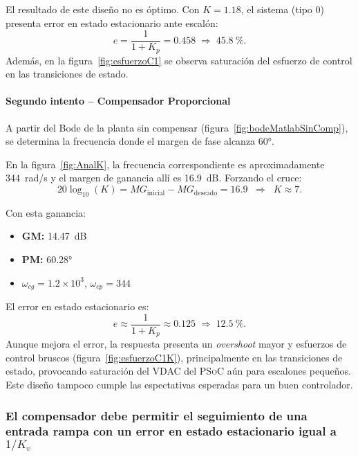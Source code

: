 El resultado de este diseño no es óptimo. Con $K = 1.18$, el sistema (tipo $0$) presenta error en estado estacionario ante escalón:
\[
e = \frac{1}{1+K_p} = 0.458 \;\Rightarrow\; \SI{45.8}{\percent}.
\]
Además, en la figura~\ref{fig:esfuerzoC1} se observa saturación del esfuerzo de control en las transiciones de estado.

\paragraph{Segundo intento – Compensador Proporcional}  

A partir del Bode de la planta sin compensar (figura~\ref{fig:bodeMatlabSinComp}), se determina la frecuencia donde el margen de fase alcanza \ang{60}. 

En la figura~\ref{fig:AnalK}, la frecuencia correspondiente es aproximadamente \SI{344}{rad/s} y el margen de ganancia allí es \SI{16.9}{dB}. Forzando el cruce:
\[
20\log_{10}(K) = MG_{\text{inicial}} - MG_{\text{deseado}} = 16.9
\;\;\Rightarrow\;\; K \approx 7.
\]

Con esta ganancia:
\begin{itemize}
	\item \textbf{GM:} \SI{14.47}{dB}
	\item \textbf{PM:} \ang{60.28}
	\item \textbf{$\omega_{cg}$}$ = 1.2 \times 10^3$, \quad \textbf{$\omega_{cp}$}$ = 344$
\end{itemize}


El error en estado estacionario es:
\[
e \approx \frac{1}{1+K_p} \approx 0.125 \;\Rightarrow\; \SI{12.5}{\percent}.
\]
Aunque mejora el error, la respuesta presenta un \emph{overshoot} mayor y esfuerzos de control bruscos (figura~\ref{fig:esfuerzoC1K}), principalmente en las transiciones de estado, provocando saturación del VDAC del \textsc{PSoC} aún para escalones pequeños. Este diseño tampoco cumple las espectativas esperadas para un buen controlador.

\subsubsection{El compensador debe permitir el seguimiento de una entrada rampa con un error en estado estacionario igual a $1/K_v$}

